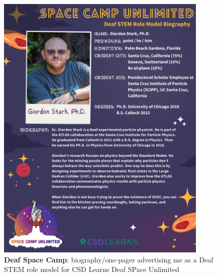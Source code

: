 \begin{figure}[h!]
	\centering
	\caption{\textbf{Deaf Space Camp}: biography/one-pager advertising me as a Deaf STEM role model for CSD Learns Deaf SPace Unlimited}
	\includegraphics[width=0.9\textwidth]{attachments/G-outreach/deafSpaceCamp}
\end{figure}


